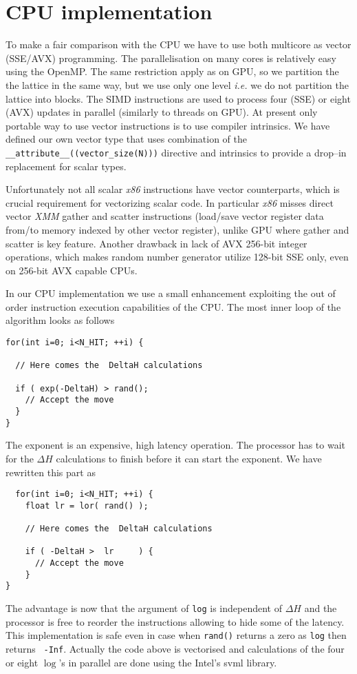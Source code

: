 \documentclass[a4paper]{llncs}
\newcommand{\code}[1]{\lstinline!#1!}
\begin{document}
\section{CPU implementation}


To make a fair comparison with the CPU we have to use both multicore
as vector (SSE/AVX) programming.  The parallelisation on many cores is
relatively easy using the OpenMP. The same restriction apply as on
GPU, so we partition the the lattice in the same way, but we use only
one level {\em i.e.} we do not partition the lattice into blocks.  The
SIMD instructions are used to process four (SSE) or eight (AVX)
updates in parallel (similarly to threads on GPU).  At present only
portable way to use vector instructions is to use compiler
intrinsics\cite{intr}. We have defined our own vector type that uses
combination of the \lstinline!__attribute__((vector_size(N)))!
directive and intrinsics to provide a drop--in replacement for scalar
types.

Unfortunately not all scalar \emph{x86} instructions have vector counterparts,
which is crucial requirement for vectorizing scalar code. In particular
\emph{x86} misses direct vector \emph{XMM} gather and scatter instructions
(load/save vector register data from/to memory indexed by other vector
register), unlike GPU where gather and scatter is key feature. Another drawback
in lack of AVX 256-bit integer operations, which makes random number generator
utilize 128-bit SSE only, even on 256-bit AVX capable CPUs.

In our CPU implementation we use a small enhancement exploiting the
out of order instruction execution capabilities of the CPU. The most
inner loop of the algorithm looks as follows
\begin{lstlisting}
for(int i=0; i<N_HIT; ++i) {

  // Here comes the  DeltaH calculations 
 
  if ( exp(-DeltaH) > rand();
    // Accept the move
  }
}
\end{lstlisting}
The exponent is an expensive, high latency operation. The processor
has to wait for the $\Delta H$ calculations to finish before it can
start the exponent. We have rewritten this part as
\begin{lstlisting}
  for(int i=0; i<N_HIT; ++i) { 
    float lr = lor( rand() );
 
    // Here comes the  DeltaH calculations 
 
    if ( -DeltaH >  lr     ) {
      // Accept the move 
    }
}
\end{lstlisting}
The advantage is now that the argument of \code{log} is independent of
$\Delta H$ and the processor is free to reorder the instructions
allowing to hide some of the latency. This implementation is safe even
in case when \code{rand()} returns a zero as \code{log} then returns {\tt
  -Inf}.  Actually the code above is vectorised and calculations of
the four or eight $\log$'s in parallel are done using the Intel's svml
library.
\end{document}
